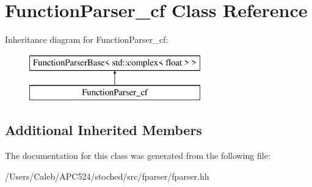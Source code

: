 \hypertarget{class_function_parser__cf}{}\section{Function\+Parser\+\_\+cf Class Reference}
\label{class_function_parser__cf}
Inheritance diagram for Function\+Parser\+\_\+cf\+:\begin{figure}[H]
\begin{center}
\leavevmode
\includegraphics[height=2.000000cm]{class_function_parser__cf}
\end{center}
\end{figure}
\subsection*{Additional Inherited Members}


The documentation for this class was generated from the following file\+:\begin{DoxyCompactItemize}
\item 
/\+Users/\+Caleb/\+A\+P\+C524/stoched/src/fparser/fparser.\+hh\end{DoxyCompactItemize}

